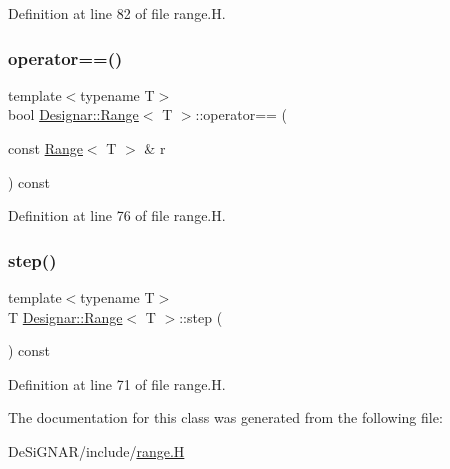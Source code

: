 Definition at line 82 of file range.\+H.

\mbox{\label{class_designar_1_1_range_ac15a931a2a2de890571f85cff64f6891}} 
\subsubsection{\texorpdfstring{operator==()}{operator==()}}
{\footnotesize\ttfamily template$<$typename T$>$ \\
bool \hyperlink{class_designar_1_1_range}{Designar\+::\+Range}$<$ T $>$\+::operator== (\begin{DoxyParamCaption}\item[{const \hyperlink{class_designar_1_1_range}{Range}$<$ T $>$ \&}]{r }\end{DoxyParamCaption}) const\hspace{0.3cm}{\ttfamily [inline]}}



Definition at line 76 of file range.\+H.

\mbox{\label{class_designar_1_1_range_a831f82b8651e4b4a437aa786288b5aef}} 
\subsubsection{\texorpdfstring{step()}{step()}}
{\footnotesize\ttfamily template$<$typename T$>$ \\
T \hyperlink{class_designar_1_1_range}{Designar\+::\+Range}$<$ T $>$\+::step (\begin{DoxyParamCaption}{ }\end{DoxyParamCaption}) const\hspace{0.3cm}{\ttfamily [inline]}}



Definition at line 71 of file range.\+H.



The documentation for this class was generated from the following file\+:\begin{DoxyCompactItemize}
\item 
De\+Si\+G\+N\+A\+R/include/\hyperlink{range_8_h}{range.\+H}\end{DoxyCompactItemize}
